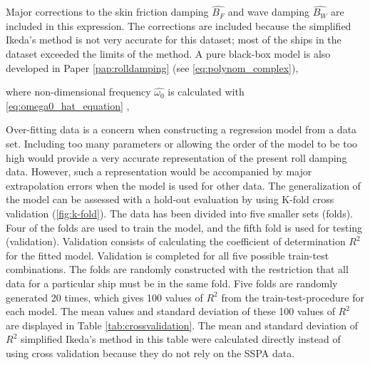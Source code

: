\noindent Major corrections to the skin friction damping $\hat{B_F}$ and wave damping $\hat{B_W}$ are included in this expression. The corrections are included because the simplified Ikeda's method is not very accurate for this dataset; most of the ships in the dataset exceeded the limits of the method. A pure black-box model is also developed in Paper \ref{pap:rolldamping} (see \autoref{eq:polynom_complex}),


\noindent where non-dimensional frequency $\hat{\omega_0}$ is calculated with \autoref{eq:omega0_hat_equation} \cite{himeno_prediction_1981},


\noindent Over-fitting data is a concern when constructing a regression model from a data set. Including too many parameters or allowing the order of the model to be too high would provide a very accurate representation of the present roll damping data. However, such a representation would be accompanied by major extrapolation errors when the model is used for other data. The generalization of the model can be assessed with a hold-out evaluation by using K-fold cross validation \cite{mosteller_data_1968} (\autoref{fig:k-fold}). The data has been divided into five smaller sets (folds). Four of the folds are used to train the model, and the fifth fold is used for testing (validation). Validation consists of calculating the coefficient of determination $R^2$ for the fitted model. Validation is completed for all five possible train-test combinations. 
The folds are randomly constructed with the restriction that all data for a particular ship must be in the same fold. Five folds are randomly generated 20 times, which gives 100 values of $R^2$ from the train-test-procedure for each model. The mean values and standard deviation of these 100 values of $R^2$ are displayed in Table \ref{tab:crossvalidation}. The mean and standard deviation of $R^2$ simplified Ikeda's method in this table were calculated directly instead of using cross validation because they do not rely on the SSPA data.

